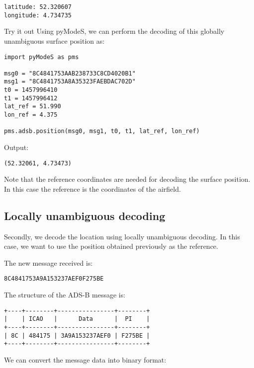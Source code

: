 \begin{verbatim}
latitude: 52.320607
longitude: 4.734735
\end{verbatim}

\begin{notebox}{Try it out}
Using pyModeS, we can perform the decoding of this globally unambiguous surface position as: 

\begin{verbatim}
import pyModeS as pms

msg0 = "8C4841753AAB238733C8CD4020B1"
msg1 = "8C4841753A8A35323FAEBDAC702D"
t0 = 1457996410
t1 = 1457996412
lat_ref = 51.990
lon_ref = 4.375

pms.adsb.position(msg0, msg1, t0, t1, lat_ref, lon_ref)
\end{verbatim}

Output: 

\begin{verbatim}
(52.32061, 4.73473)
\end{verbatim}

Note that the reference coordinates are needed for decoding the surface position. In this case the reference is the coordinates of the airfield. 

\end{notebox}



\subsection{Locally unambiguous decoding}

Secondly, we decode the location using locally unambiguous decoding. In this case, we want to use the position obtained previously as the reference.

The new message received is:

\begin{verbatim}
8C4841753A9A153237AEF0F275BE
\end{verbatim}

The structure of the ADS-B message is:

\begin{verbatim}
+----+--------+----------------+--------+
|    | ICAO   |      Data      |  PI    |
+----+--------+----------------+--------+
| 8C | 484175 | 3A9A153237AEF0 | F275BE |
+----+--------+----------------+--------+
\end{verbatim}

We can convert the message data into binary format:


